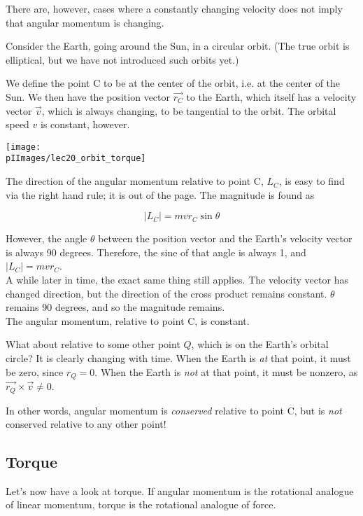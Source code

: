 There are, however, cases where a constantly changing velocity does not imply that angular momentum is changing.

Consider the Earth, going around the Sun, in a circular orbit. (The true orbit is elliptical, but we have not introduced such orbits yet.)

We define the point C to be at the center of the orbit, i.e. at the center of the Sun. We then have the position vector $\vec{r_C}$ to the Earth, which itself has a velocity vector $\vec{v}$, which is always changing, to be tangential to the orbit. The orbital speed $v$ is constant, however.

\begin{center}
\texttt{[image: \\pIImages/lec20\_orbit\_torque]}
\end{center}

The direction of the angular momentum relative to point C, $L_C$, is easy to find via the right hand rule; it is out of the page. The magnitude is found as

\begin{equation}
|L_C| = m v r_C \sin \theta
\end{equation}

However, the angle $\theta$ between the position vector and the Earth's velocity vector is always 90 degrees. Therefore, the sine of that angle is always 1, and $|L_C| = m v r_C$.\\
A while later in time, the exact same thing still applies. The velocity vector has changed direction, but the direction of the cross product remains constant. $\theta$ remains 90 degrees, and so the magnitude remains.\\
The angular momentum, relative to point C, is constant.

What about relative to some other point $Q$, which is on the Earth's orbital circle? It is clearly changing with time. When the Earth is \emph{at} that point, it must be zero, since $r_Q = 0$. When the Earth is \emph{not} at that point, it must be nonzero, as $\vec{r_Q} \times \vec{v} \neq 0$.

In other words, angular momentum is \emph{conserved} relative to point C, but is \emph{not} conserved relative to any other point!

\subsection{Torque}

Let's now have a look at torque. If angular momentum is the rotational analogue of linear momentum, torque is the rotational analogue of force.

